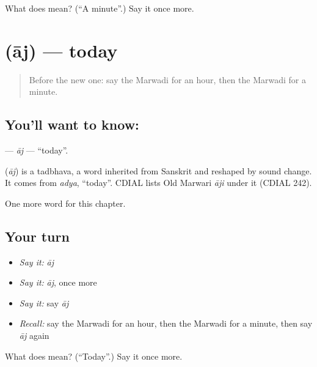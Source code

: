 \begin{tcolorbox}[breakable,colback=teal!4,colframe=teal!35!black,title={Before you move on}]
What does  mean? (\textquotedblleft{}A minute\textquotedblright{}.) Say it once more.
\end{tcolorbox}
\section[\texorpdfstring{\mw{आज} (āj)}{आज (āj)}]{ (āj) — today}

\label{lesson:MW-C79-aj}



\begin{quote}
Before the new one: say the Marwadi for an hour, then the Marwadi for a minute.
\end{quote}

\subsection*{You'll want to know: }
\textbf{} — \emph{āj} — \textquotedblleft{}today\textquotedblright{}.

\begin{cousinweb}
\textbf{} (\emph{āj}) is a tadbhava, a word inherited from Sanskrit and reshaped by sound change. It comes from \emph{adya}, \textquotedblleft{}today\textquotedblright{}. CDIAL lists Old Marwari \emph{āji} under it (CDIAL 242).
\end{cousinweb}

\begin{grammarlens}[title={What you've built}]
One more word for this chapter.
\end{grammarlens}

\subsection*{Your turn}
\begin{itemize}
\raggedright
  \item \emph{Say it:} \emph{āj}
  \item \emph{Say it:} \emph{āj}, once more
  \item \emph{Say it:} say \emph{āj}
  \item \emph{Recall:} say the Marwadi for an hour, then the Marwadi for a minute, then say \emph{āj} again
\end{itemize}

\begin{tcolorbox}[breakable,colback=teal!4,colframe=teal!35!black,title={Before you move on}]
What does  mean? (\textquotedblleft{}Today\textquotedblright{}.) Say it once more.
\end{tcolorbox}
